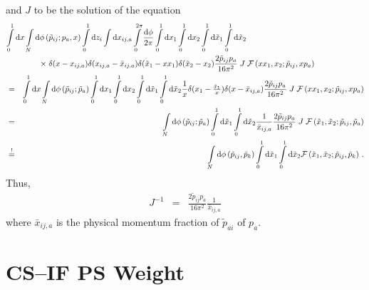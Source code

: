 \documentclass[a4paper,10pt]{scrartcl}
\newcommand{\nnb}{\nonumber}
\newcommand{\bea}{\begin{eqnarray}}
\newcommand{\eea}{\end{eqnarray}}
\newcommand{\done}{{\rm d}}
\begin{document}
and $J$ to be the solution of the equation
\bea
\lefteqn{\int\limits_0^1\done x
         \int\limits_N\done\phi\left(\tilde{p}_{ij};p_a,x\right)
         \int\limits_0^1\done z_i \int\done x_{ij,a}
         \int\limits_0^{2\pi}\frac{\done\phi}{2\pi}
         \int\limits_0^1\done x_1\int\limits_0^1\done x_2
         \int\limits_0^1\done\tilde{x}_1\int\limits_0^1\done\tilde{x}_2}\nnb\\
\lefteqn{\hspace*{15mm}\times\;
         \delta(x-x_{ij,a})\delta(x_{ij,a}-\bar{x}_{ij,a})
         \delta(\tilde{x}_1-xx_1)\delta(\tilde{x}_2-x_2)
         \frac{2\tilde{p}_{ij}p_a}{16\pi^2}\;J\;
         \mathcal{F}\left(xx_1,x_2;\tilde{p}_{ij},xp_a\right)}\nnb\\
& = & \int\limits_0^1\done x
      \int\limits_N\done\phi\left(\tilde{p}_{ij};\tilde{p}_a\right)
      \int\limits_0^1\done x_1\int\limits_0^1\done x_2
      \int\limits_0^1\done\tilde{x}_1\int\limits_0^1\done\tilde{x}_2
      \frac{1}{x}\delta(x_1-\tfrac{\tilde{x}_1}{x})\delta(x-\bar{x}_{ij,a})
      \frac{2\tilde{p}_{ij}p_a}{16\pi^2}\;J\;
      \mathcal{F}\left(xx_1,x_2;\tilde{p}_{ij},xp_a\right) \nnb\\
& = & \int\limits_N\done\phi\left(\tilde{p}_{ij};\tilde{p}_a\right)
      \int\limits_0^1\done\tilde{x}_1\int\limits_0^1\done\tilde{x}_2
      \frac{1}{\bar{x}_{ij,a}}
      \frac{2\tilde{p}_{ij}p_a}{16\pi^2}\;J\;
      \mathcal{F}\left(\tilde{x}_1,\tilde{x}_2;\tilde{p}_{ij},\tilde{p}_a\right) \nnb\\
& \stackrel{!}{=} & \int\limits_N\done\phi\left(\tilde{p}_{ij},\tilde{p}_k\right)
                    \int\limits_0^1\done\tilde{x}_1\int\limits_0^1\done\tilde{x}_2
                    \mathcal{F}\left(\tilde{x}_1,\tilde{x}_2;\tilde{p}_{ij},\tilde{p}_k\right)\,.\nnb
\eea
Thus,
\bea
 J^{-1}
& = & \frac{2\tilde{p}_{ij}p_a}{16\pi^2}\frac{1}{\bar{x}_{ij,a}}
\eea
where $\bar{x}_{ij,a}$ is the physical momentum fraction of $\tilde{p}_{ai}$ of
$p_a$.





\section{CS--IF PS Weight}
\end{document}

